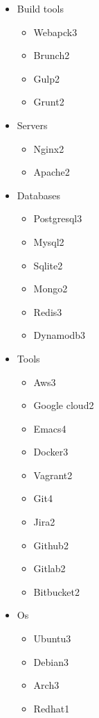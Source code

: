 \documentclass[11pt,letter,sans]{moderncv}
\begin{document}
\begin{itemize}
      \item Build tools
      \begin{itemize}
\item Webapck\hfill 3\item Brunch\hfill 2\item Gulp\hfill 2\item Grunt\hfill 2\end{itemize}
      \item Servers
      \begin{itemize}
\item Nginx\hfill 2\item Apache\hfill 2\end{itemize}
      \item Databases
      \begin{itemize}
\item Postgresql\hfill 3\item Mysql\hfill 2\item Sqlite\hfill 2\item Mongo\hfill 2\item Redis\hfill 3\item Dynamodb\hfill 3\end{itemize}
      \item Tools
      \begin{itemize}
\item Aws\hfill 3\item Google cloud\hfill 2\item Emacs\hfill 4\item Docker\hfill 3\item Vagrant\hfill 2\item Git\hfill 4\item Jira\hfill 2\item Github\hfill 2\item Gitlab\hfill 2\item Bitbucket\hfill 2\end{itemize}
      \item Os
      \begin{itemize}
\item Ubuntu\hfill 3\item Debian\hfill 3\item Arch\hfill 3\item Redhat\hfill 1\end{itemize}
  \end{itemize}
\end{document}
